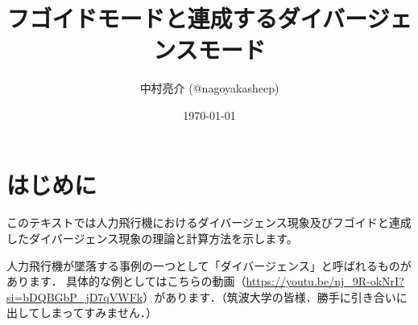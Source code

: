 \documentclass{jarticle}
\title{フゴイドモードと連成するダイバージェンスモード}
\author{中村亮介 (@nagoyakasheep) }
\date{\today} %
\begin{document}
\maketitle

\section{はじめに}

このテキストでは人力飛行機におけるダイバージェンス現象及びフゴイドと連成したダイバージェンス現象の理論と計算方法を示します。

人力飛行機が墜落する事例の一つとして「ダイバージェンス」と呼ばれるものがあります．
具体的な例としてはこちらの動画（\url{https://youtu.be/nj_9R-okNrI?si=bDQBGbP_jD7qVWFk}）があります．（筑波大学の皆様．勝手に引き合いに出してしまってすみません．）
\end{document}

